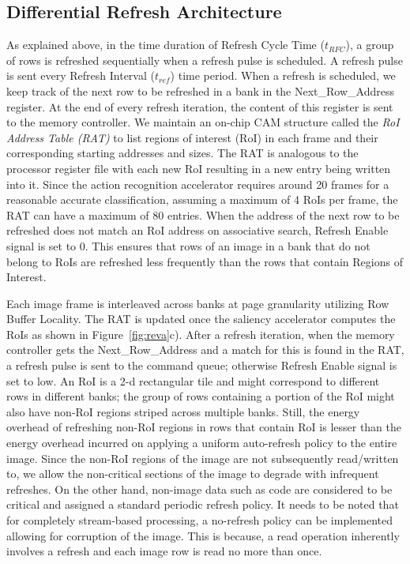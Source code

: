 \subsection{Differential Refresh Architecture}
As explained above, in the time duration of Refresh Cycle Time ($t_{RFC}$), a group of rows is refreshed sequentially when a refresh pulse is scheduled. A refresh pulse is sent every Refresh Interval ($t_{ref}$) time period.  When a refresh is scheduled, we keep track of the next row to be refreshed in a bank in the Next\_Row\_Address register. At the end of every refresh iteration, the content of this register is sent to the memory controller. 
We maintain an on-chip CAM structure called the \emph{RoI Address Table (RAT)} to list regions of interest (RoI) in each frame and their corresponding starting addresses and sizes. The RAT is analogous to the processor register file with each new RoI resulting in a new entry being written into it. Since the action recognition accelerator requires around 20 frames for a reasonable accurate classification, assuming a maximum of 4 RoIs per frame, the RAT can have a maximum of 80 entries. When the address of the next row to be refreshed does not match an RoI address on associative search, Refresh Enable signal is set to 0. This ensures that rows of an image in a bank that do not belong to RoIs are refreshed less frequently than the rows that contain Regions of Interest. 

Each image frame is interleaved across banks at page granularity utilizing Row Buffer Locality. The RAT is updated once the saliency accelerator computes the RoIs as shown in Figure~\ref{fig:reva}c). After a refresh iteration, when the memory controller gets the Next\_Row\_Address and a match for this is found in the RAT, a refresh pulse is sent to the command queue; otherwise Refresh Enable signal is set to low. An RoI is a 2-d rectangular tile and might correspond to different rows in different banks; the group of rows containing a portion of the RoI might also have non-RoI regions striped across multiple banks. Still, the energy overhead of refreshing non-RoI regions in rows that contain RoI is lesser than the energy overhead incurred on applying a uniform auto-refresh policy to the entire image. Since the non-RoI regions of the image are not subsequently read/written to, we allow the non-critical sections of the image to degrade with infrequent refreshes. On the other hand, non-image data such as code are considered to be critical and assigned a standard periodic refresh policy. It needs to be noted that for completely stream-based processing, a no-refresh policy can be implemented allowing for corruption of the image. This is because, a read operation inherently involves a refresh and each image row is read no more than once.
 
